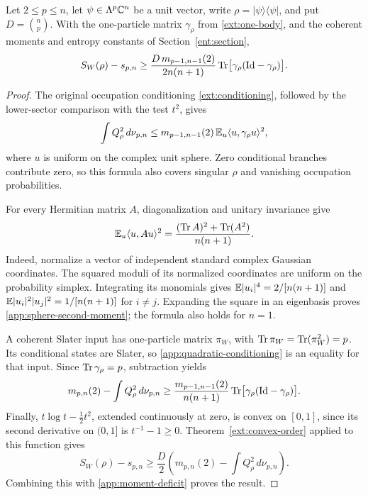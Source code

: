 \begin{proposition}
\label{app:deficit}
Let $2\le p\le n$, let $\psi\in\Lambda^p\mathbb C^n$ be a unit vector,
write $\rho=|\psi\rangle\langle\psi|$, and put $D=\binom np$.
With the one-particle matrix $\gamma_\rho$ from
\eqref{ext:one-body}, and the coherent moments and entropy constants
of Section~\ref{ent:section},
\begin{equation}
 S_W(\rho)-s_{p,n}
 \ge
 \frac{D\,m_{p-1,n-1}(2)}{2n(n+1)}
 \operatorname{Tr}\bigl[\gamma_\rho(\mathrm{Id}-\gamma_\rho)\bigr].
 \label{app:entropy-deficit}
\end{equation}
\end{proposition}
\begin{proof}
The original occupation conditioning \eqref{ext:conditioning},
followed by the lower-sector comparison with the test $t^2$, gives
\begin{equation}
 \int Q_\rho^2\,d\nu_{p,n}
 \le m_{p-1,n-1}(2)\,
       \mathbb E_u\langle u,\gamma_\rho u\rangle^2,
 \label{app:quadratic-conditioning}
\end{equation}
where $u$ is uniform on the complex unit sphere.  Zero conditional
branches contribute zero, so this formula also covers singular
$\rho$ and vanishing occupation probabilities.

For every Hermitian matrix $A$, diagonalization and unitary invariance
give
\begin{equation}
 \mathbb E_u\langle u,Au\rangle^2
 =\frac{(\operatorname{Tr} A)^2+\operatorname{Tr}(A^2)}{n(n+1)}.
 \label{app:sphere-second-moment}
\end{equation}
Indeed, normalize a vector of independent standard complex Gaussian
coordinates.  The squared moduli of its normalized coordinates are
uniform on the probability simplex.  Integrating its monomials gives
$\mathbb E|u_i|^4=2/[n(n+1)]$ and
$\mathbb E|u_i|^2|u_j|^2=1/[n(n+1)]$ for $i\ne j$.
Expanding the square in an eigenbasis proves
\eqref{app:sphere-second-moment}; the formula also holds for $n=1$.

A coherent Slater input has one-particle matrix $\pi_W$, with
$\operatorname{Tr}\pi_W=\operatorname{Tr}(\pi_W^2)=p$.  Its conditional states are Slater,
so \eqref{app:quadratic-conditioning} is an equality for that input.
Since $\operatorname{Tr}\gamma_\rho=p$, subtraction yields
\begin{equation}
 m_{p,n}(2)-\int Q_\rho^2\,d\nu_{p,n}
 \ge\frac{m_{p-1,n-1}(2)}{n(n+1)}
          \operatorname{Tr}\bigl[\gamma_\rho(\mathrm{Id}-\gamma_\rho)\bigr].
 \label{app:moment-deficit}
\end{equation}
Finally, $t\log t-\tfrac12t^2$, extended continuously at zero,
is convex on $[0,1]$, since its second derivative on $(0,1]$ is
$t^{-1}-1\ge0$.  Theorem~\ref{ext:convex-order} applied to this
function gives
\[
 S_W(\rho)-s_{p,n}
 \ge\frac D2\left(m_{p,n}(2)-\int Q_\rho^2\,d\nu_{p,n}\right).
\]
Combining this with \eqref{app:moment-deficit} proves the result.
\end{proof}

